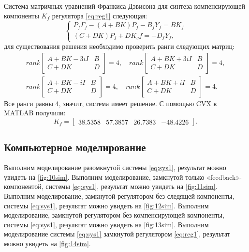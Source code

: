 Система матричных уравнений Франкиса-Дэвисона для синтеза 
компенсирующей компоненты $K_f$ регулятора \eqref{eq:reg1} следующая:
\begin{equation*}
    \begin{cases}
        P_f\Gamma_f-(A+BK)P_f-B_fY_f=BK_f\\
        (C+DK)P_f+DK_gf=-D_fY_f,
    \end{cases}
\end{equation*}
для существования решения необходимо проверить ранги следующих матриц:
\begin{gather*}
    rank\begin{bmatrix}
        A+BK-3iI & B \\
        C+DK & D
    \end{bmatrix}=4,\quad
    rank\begin{bmatrix}
        A+BK+3iI & B \\
        C+DK & D
    \end{bmatrix}=4,\\
    rank\begin{bmatrix}
        A+BK-iI & B \\
        C+DK & D
    \end{bmatrix}=4,\quad
    rank\begin{bmatrix}
        A+BK+iI & B \\
        C+DK & D
    \end{bmatrix}=4.
\end{gather*}
Все ранги равны 4, значит, система имеет решение.
С помощью CVX в MATLAB получили:
\begin{equation}
    \label{eq:Kf}
    K_f=\begin{bmatrix}
        38.5358	&57.3857	&26.7383&	-48.4226
    \end{bmatrix}.
\end{equation}

\subsection{Компьютерное моделирование}

Выполним моделирование разомкнутой системы \eqref{eq:sys1}, результат можно
увидеть на \autoref{fig:10sim}.
Выполним моделирование, замкнутой только «feedback»-компонентой, системы \eqref{eq:sys1}, результат можно
увидеть на \autoref{fig:11sim}.
Выполним моделирование,  замкнутой регулятором без следящей компоненты, системы \eqref{eq:sys1}, результат можно
увидеть на \autoref{fig:12sim}.
Выполним моделирование,  замкнутой регулятором без компенсирующей компоненты, системы \eqref{eq:sys1}, результат можно
увидеть на \autoref{fig:13sim}.
Выполним моделирование системы \eqref{eq:sys1} замкнутой регулятором \eqref{eq:reg1}, результат можно
увидеть на \autoref{fig:14sim}.

